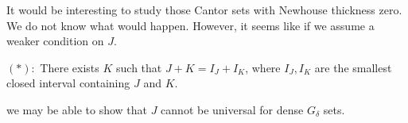 It would be interesting to study those Cantor sets with Newhouse thickness zero. We do not  know what would happen. However, it seems like if we assume a weaker condition on $J$. 

\medskip

\noindent $(\ast):$ There exists $K$ such that $J+K = I_J+I_K$, where $I_J,I_K$ are the  smallest closed interval containing $J$ and $K$. 

\medskip

we  may be able to show that  $J$  cannot be  universal for dense $G_{\delta}$ sets. 

